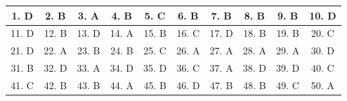 \documentclass[12pt,a4paper]{article}
\begin{document}
\begin{center}\begin{tabular}{|c|c|c|c|c|c|c|c|c|c|}
\hline
1. D & 2. B & 3. A & 4. B & 5. C & 6. B & 7. B & 8. B & 9. B & 10. D\\\hline
11. D & 12. B & 13. D & 14. A & 15. B & 16. C & 17. D & 18. B & 19. B & 20. C\\\hline
21. D & 22. A & 23. B & 24. B & 25. C & 26. A & 27. A & 28. A & 29. A & 30. D\\\hline
31. B & 32. D & 33. A & 34. D & 35. D & 36. C & 37. A & 38. D & 39. D & 40. C\\\hline
41. C & 42. B & 43. B & 44. A & 45. B & 46. D & 47. B & 48. B & 49. C & 50. A\\\hline
\end{tabular}\end{center}
\end{document}
